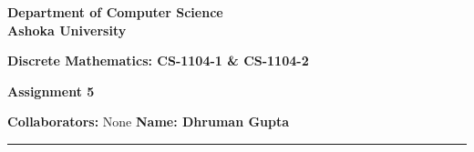 \documentclass[a4paper]{article}
\begin{document}
\begin{center}
{\large \bf \color{red}  Department of Computer Science} \\
{\large \bf \color{red}  Ashoka University} \\

\vspace{0.1in}

{\large \bf \color{blue}  Discrete Mathematics: CS-1104-1 \& CS-1104-2}

\vspace{0.05in}

    { \bf \color{YellowOrange} Assignment 5}
\end{center}
\medskip

{\textbf{Collaborators:} None} \hfill {\textbf{Name: Dhruman Gupta} }

\bigskip
\hrule


\end{document}
